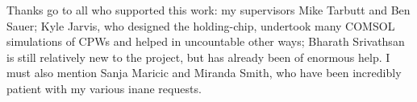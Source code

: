 Thanks go to all who supported this work: my supervisors Mike Tarbutt and Ben
Sauer; Kyle Jarvis, who designed the holding-chip, undertook many COMSOL
simulations of CPWs and helped in uncountable other ways; Bharath Srivathsan is
still relatively new to the project, but has already been of enormous help. I
must also mention Sanja Maricic and Miranda Smith, who have been incredibly
patient with my various inane requests.

